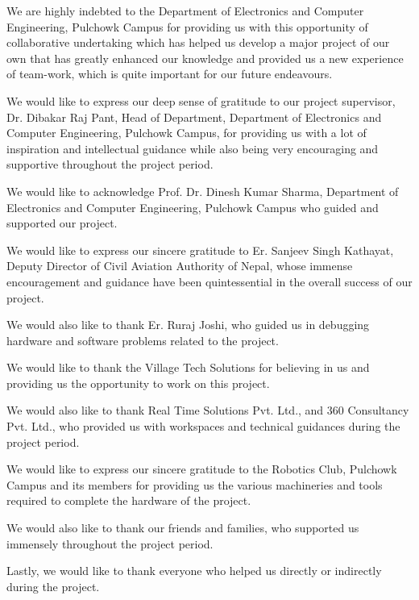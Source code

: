 	\vspace{0.5cm}	

We are highly indebted to the Department of Electronics and Computer Engineering, Pulchowk Campus for providing us with this opportunity of collaborative undertaking which has helped us develop a major project of our own that has greatly enhanced our knowledge and provided us a new experience of team-work, which is quite important for our future endeavours.

We would like to express our deep sense of gratitude to our project supervisor, Dr. Dibakar Raj Pant, Head of Department, Department of Electronics and Computer Engineering, Pulchowk Campus, for providing us with a lot of inspiration and intellectual guidance while also being very encouraging and supportive throughout the project period.

We would like to acknowledge Prof. Dr. Dinesh Kumar Sharma, Department of Electronics and Computer Engineering, Pulchowk Campus who guided and supported our project.

We would like to express our sincere gratitude to Er. Sanjeev Singh Kathayat, Deputy Director of Civil Aviation Authority of Nepal, whose immense encouragement and guidance have been quintessential in the overall success of our project. 

We would also like to thank Er. Ruraj Joshi, who guided us in debugging hardware and software problems related to the project. 

We would like to thank the Village Tech Solutions for believing in us and providing us the opportunity to work on this project.

We would also like to thank Real Time Solutions Pvt. Ltd., and 360 Consultancy  Pvt. Ltd., who provided us with workspaces and technical guidances during the project period. 

We would like to express our sincere gratitude to the Robotics Club, Pulchowk Campus and its members for providing us the various machineries and tools required to complete the hardware of the project.

We would also like to thank our friends and families, who supported us immensely throughout the project period. 

Lastly, we would like to thank everyone who helped us directly or indirectly during the project.
